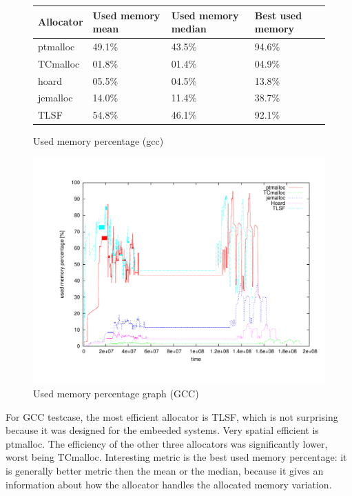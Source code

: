 \begin{figure}[h]
\begin{center}
\begin{tabular}{|l|l|l|l|}
\hline
Allocator & Used memory mean & Used memory median & Best used memory \\ \hline \hline
ptmalloc  & 49.1\% & 43.5\% & 94.6\% \\ \hline
TCmalloc  & 01.8\% & 01.4\% & 04.9\% \\ \hline
hoard     & 05.5\% & 04.5\% & 13.8\% \\ \hline
jemalloc  & 14.0\% & 11.4\% & 38.7\% \\ \hline
TLSF      & 54.8\% & 46.1\% & 92.1\% \\  \hline
\end{tabular}
\caption{Used memory percentage (gcc)}
\label{used:gcc:table}
\end{center}
\end{figure}

\begin{figure}[h]
\begin{center}
\includegraphics[width=\linewidth,keepaspectratio]{fig/gcc-used}
\caption{Used memory percentage graph (GCC)}
\label{used:gcc:graph}
\end{center}
\end{figure}

For GCC testcase, the most efficient allocator is TLSF, which is not surprising because it was designed for the embeeded systems. Very spatial efficient is ptmalloc. The efficiency of the other three allocators was significantly lower, worst being TCmalloc. Interesting metric is the best used memory percentage: it is generally better metric then the mean or the median, because it gives an information about how the allocator handles the allocated memory variation.

